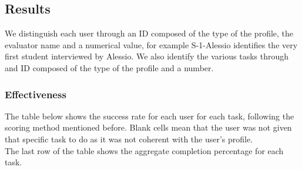 \subsection{Results}

    We distinguish each user through an ID composed of the type of the profile, the evaluator name and a numerical value, for example S-1-Alessio identifies the very first student interviewed by Alessio. We also identify the various tasks through and ID composed of the type of the profile and a number.
\subsubsection{Effectiveness}
    The table below shows the success rate for each user for each task, following the scoring method mentioned before. Blank cells mean that the user was not given that specific task to do as it was not coherent with the user's profile.\\
    The last row of the table shows the aggregate completion percentage for each task.
